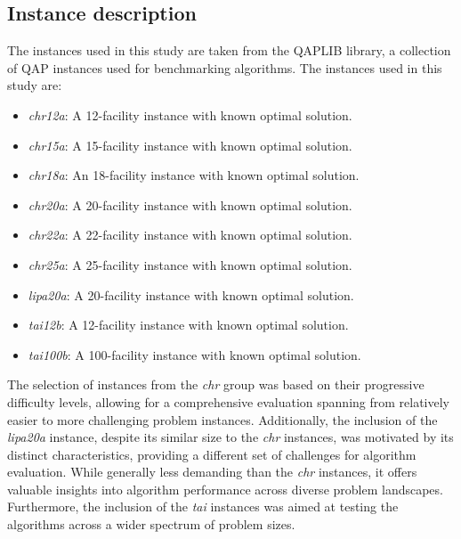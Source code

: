 \documentclass{article}
\begin{document}
\subsection{Instance description}\label{subsec:instance-description}
The instances used in this study are taken from the QAPLIB library, a collection of QAP instances used for benchmarking algorithms.
The instances used in this study are:
\begin{itemize}
    \item \textit{chr12a}: A 12-facility instance with known optimal solution.
    \item \textit{chr15a}: A 15-facility instance with known optimal solution.
    \item \textit{chr18a}: An 18-facility instance with known optimal solution.
    \item \textit{chr20a}: A 20-facility instance with known optimal solution.
    \item \textit{chr22a}: A 22-facility instance with known optimal solution.
    \item \textit{chr25a}: A 25-facility instance with known optimal solution.
    \item \textit{lipa20a}: A 20-facility instance with known optimal solution.
    \item \textit{tai12b}: A 12-facility instance with known optimal solution.
    \item \textit{tai100b}: A 100-facility instance with known optimal solution.
\end{itemize}

The selection of instances from the \textit{chr} group was based on their progressive difficulty levels,
allowing for a comprehensive evaluation spanning from relatively easier to more challenging problem instances.
Additionally, the inclusion of the \textit{lipa20a} instance, despite its similar size to the \textit{chr} instances,
was motivated by its distinct characteristics, providing a different set of challenges for algorithm evaluation.
While generally less demanding than the \textit{chr} instances, it offers valuable insights into algorithm performance across diverse problem landscapes.
Furthermore, the inclusion of the \textit{tai} instances was aimed at testing the algorithms across a wider spectrum of problem sizes.
\end{document}
